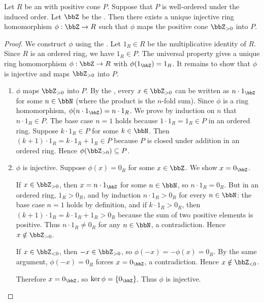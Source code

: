 \begin{theorem} \label{theorem:integers_uniqueness}
    Let $R$ be an  with positive cone $P$. Suppose that $P$ is well-ordered under the induced order. Let $\bbZ$ be the . Then there exists a unique injective ring homomorphism $\phi: \bbZ \to R$ such that $\phi$ maps the positive cone $\bbZ_{> 0}$ into $P$.
\end{theorem}

\begin{proof}
    We construct $\phi$ using the . Let $1_R \in R$ be the multiplicative identity of $R$. Since $R$ is an ordered ring, we have $1_R \in P$. The universal property gives a unique ring homomorphism $\phi: \bbZ \to R$ with $\phi(1_\bbZ) = 1_R$. It remains to show that $\phi$ is injective and maps $\bbZ_{> 0}$ into $P$.

    \begin{enumerate}
        \item $\phi$ maps $\bbZ_{> 0}$ into $P$. By the , every $x \in \bbZ_{> 0}$ can be written as $n \cdot 1_\bbZ$ for some $n \in \bbN$ (where the product is the $n$-fold sum). Since $\phi$ is a ring homomorphism, $\phi(n \cdot 1_\bbZ) = n \cdot 1_R$. We prove by induction on $n$ that $n \cdot 1_R \in P$. The base case $n = 1$ holds because $1 \cdot 1_R = 1_R \in P$ in an ordered ring. Suppose $k \cdot 1_R \in P$ for some $k \in \bbN$. Then $(k+1) \cdot 1_R = k \cdot 1_R + 1_R \in P$ because $P$ is closed under addition in an ordered ring. Hence $\phi(\bbZ_{> 0}) \subseteq P$.

        \item $\phi$ is injective. Suppose $\phi(x) = 0_R$ for some $x \in \bbZ$. We show $x = 0_\bbZ$.

        If $x \in \bbZ_{> 0}$, then $x = n \cdot 1_\bbZ$ for some $n \in \bbN$, so $n \cdot 1_R = 0_R$. But in an ordered ring, $1_R > 0_R$, and by induction $n \cdot 1_R > 0_R$ for every $n \in \bbN$: the base case $n = 1$ holds by definition, and if $k \cdot 1_R > 0_R$, then $(k+1) \cdot 1_R = k \cdot 1_R + 1_R > 0_R$ because the sum of two positive elements is positive. Thus $n \cdot 1_R \neq 0_R$ for any $n \in \bbN$, a contradiction. Hence $x \notin \bbZ_{> 0}$.

        If $x \in \bbZ_{< 0}$, then $-x \in \bbZ_{> 0}$, so $\phi(-x) = -\phi(x) = 0_R$. By the same argument, $\phi(-x) = 0_R$ forces $x = 0_\bbZ$, a contradiction. Hence $x \notin \bbZ_{< 0}$.

        Therefore $x = 0_\bbZ$, so $\ker \phi = \{0_\bbZ\}$. Thus $\phi$ is injective.
    \end{enumerate}
\end{proof}